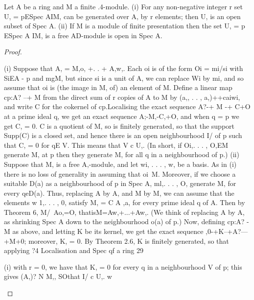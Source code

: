 \begin{theorem}[Theorem 4.10]\label{mcrt-auto-theorem-4-10}
\begin{mathematicalrecord}
Let A be a ring and M a finite .4-module.
  (i) For any non-negative integer r set
           U, = {pESpec AIM, can be generated over A, by r elements};
then U, is an open subset of Spec A.
   (ii) If M is a module of finite presentation then the set
           U, = {p ESpec A IM, is a free AD-module}
is open in Spec A.
\end{mathematicalrecord}
\end{theorem}
\begin{proof}
\begin{mathematicalrecord}
(i) Suppose that A, = M,o, +. . + A,w,. Each oi is of the form
Oi = mi/si with SiEA - p and mgM, but since si is a unit of A, we can
replace Wi by mi, and so assume that oi is (the image in M, of) an element
of M. Define a linear map cp:A? --+ M from the direct sum of r copies of
A to M by (a,, . . , a,)++caiwi,  and write C for the cokernel of cp.Localising
the exact sequence A?-+ M -+ C+O at a prime ideal q, we get an
exact sequence
           A;-M,-C,+O,
and when q = p we get C, = 0. C is a quotient of M, so is finitely generated,
so that the support Supp(C) is a closed set, and hence there is an open
neighbourhood I/ of p such that C, = 0 for qE V. This means that V c U,.
(In short, if Oi,. . . , O,EM generate M, at p then they generate M, for all q
in a neighbourhood of p.)
   (ii) Suppose that M, is a free A,-module, and let wi, . . . , w, be a basis.
As in (i) there is no loss of generality in assuming that oi~M. Moreover,
if we choose a suitable D(a) as a neighbourhood of p in Spec A, ml,. . . , O,
generate M, for every qeD(a). Thus, replacing A by A, and M by M,
we can assume that the elements w 1,. . . , 0, satisfy M, = C A ,a, for every
prime ideal q of A. Then by Theorem 6,
          M/~Ao,=O,           thatisM=Aw,+...+Aw,.
(We think of replacing A by A, as shrinking Spec A down to the
neighbourhood o(a) of p.) Now, defining cp:A? -M         as above, and letting
K be its kernel, we get the exact sequence
          ,0-+K--+A?---+M+0;
moreover, K, = 0. By Theorem 2.6, K is finitely generated, so that applying
?4         Localisation    and Spec     qf a ring                                           29

(i) with   r = 0, we have that      K, = 0 for every q in a neighbourhood                V of
p; this gives (A,)? N M,,      SOthat I/ c U,.        w
\end{mathematicalrecord}
\end{proof}


